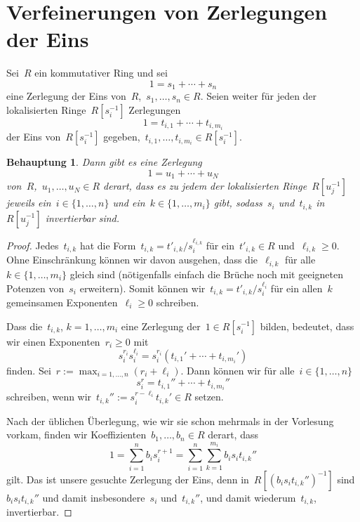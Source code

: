 \documentclass[12pt,a4paper,ngerman]{scrartcl}
\theoremstyle{definition}
\theoremstyle{plain}
\newtheorem*{beh}{Behauptung}
\theoremstyle{remark}
\begin{document}
\section*{Verfeinerungen von Zerlegungen der Eins}

Sei~$R$ ein kommutativer Ring und sei
\[ 1 = s_1 + \cdots + s_n \] eine Zerlegung
der Eins von~$R$,~$s_1,\ldots,s_n \in R$. Seien weiter für jeden der
lokalisierten Ringe~$R[s_i^{-1}]$ Zerlegungen
\[ 1 = t_{i,1} + \cdots + t_{i,m_i} \]
der Eins von~$R[s_i^{-1}]$ gegeben,~$t_{i,1}, \ldots, t_{i,m_i} \in
R[s_i^{-1}]$.

\begin{beh}
Dann gibt es eine Zerlegung
\[ 1 = u_1 + \cdots + u_N \]
von~$R$,~$u_1,\ldots,u_N \in R$ derart, dass es zu jedem der lokalisierten
Ringe~$R[u_j^{-1}]$ jeweils ein~$i \in \{ 1,\ldots,n \}$ und ein~$k \in \{
1,\ldots,m_i \}$ gibt, sodass~$s_i$ und~$t_{i,k}$ in~$R[u_j^{-1}]$ invertierbar
sind.
\end{beh}
\begin{proof}
Jedes~$t_{i,k}$ hat die Form~$t_{i,k} = t'_{i,k} / s_i^{\ell_{i,k}}$ für
ein~$t'_{i,k} \in R$ und~$\ell_{i,k} \geq 0$. Ohne Einschränkung können wir
davon ausgehen, dass die~$\ell_{i,k}$ für alle~$k \in \{ 1,\ldots,m_i \}$
gleich sind (nötigenfalls einfach die Brüche noch mit geeigneten Potenzen
von~$s_i$ erweitern). Somit können wir~$t_{i,k} = t'_{i,k} / s_i^{\ell_i}$ für
ein allen~$k$ gemeinsamen Exponenten~$\ell_i \geq 0$ schreiben.

Dass die~$t_{i,k}$, $k = 1,\ldots,m_i$ eine Zerlegung der~$1 \in R[s_i^{-1}]$
bilden, bedeutet, dass wir einen Exponenten~$r_i \geq 0$ mit
\[ s_i^{r_i} s_i^{\ell_i} = s_i^{r_i} (t_{i,1}' + \cdots + t_{i,m_i}') \]
finden. Sei~$r := \max_{i=1,\ldots,n} (r_i + \ell_i)$. Dann können wir für
alle~$i \in \{ 1,\ldots,n \}$
\[ s_i^r = t_{i,1}'' + \cdots + t_{i,m_i}'' \]
schreiben, wenn wir~$t_{i,k}'' := s_i^{r - \ell_i} t_{i,k}' \in R$ setzen.

Nach der üblichen Überlegung, wie wir sie schon mehrmals in der Vorlesung
vorkam, finden wir Koeffizienten~$b_1,\ldots,b_n \in R$ derart, dass
\[ 1 = \sum_{i=1}^n b_i s_i^{r+1} = \sum_{i=1}^n \sum_{k=1}^{m_i} b_i s_i t_{i,k}'' \]
gilt. Das ist unsere gesuchte Zerlegung der Eins, denn
in~$R[(b_is_it_{i,k}'')^{-1}]$ sind~$b_is_it_{i,k}''$ und damit
insbesondere~$s_i$ und~$t_{i,k}''$, und damit wiederum~$t_{i,k}$, invertierbar.
\end{proof}
\end{document}
